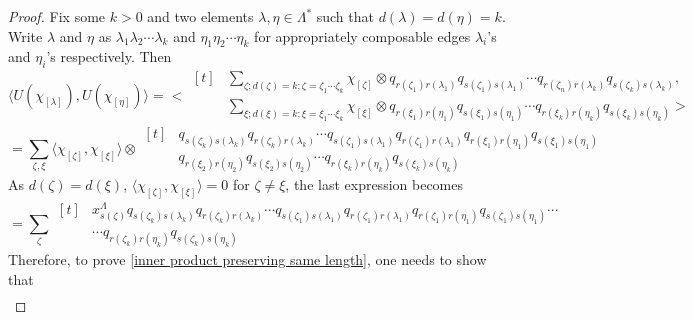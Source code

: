 \documentclass{amsart}
\theoremstyle{plain}
\theoremstyle{definition}
\theoremstyle{remark}
\numberwithin{equation}{section}
\begin{document}
\begin{proof}
\indent Fix some $k>0$ and two elements $\lambda,\eta\in\Lambda^{\ast}$ such that $d(\lambda)=d(\eta)=k$. Write $\lambda$ and $\eta$ as $\lambda_{1}\lambda_{2}\cdots\lambda_{k}$ and $\eta_{1}\eta_{2}\cdots\eta_{k}$ for appropriately composable edges $\lambda_{i}$'s and $\eta_{i}$'s respectively. Then 
\begin{equation*}
    \langle U(\chi_{[\lambda]}), U(\chi_{[\eta]})\rangle = \biggl<
    \begin{aligned}[t]
     &\sum\limits_{\zeta;d(\zeta)=k;\zeta=\zeta_{1}\cdots\zeta_{k}}\chi_{[\zeta]}\otimes q_{r(\zeta_{1})r(\lambda_{1})}q_{s(\zeta_{1})s(\lambda_{1})} \cdots q_{r(\zeta_{n})r(\lambda_{k})}q_{s(\zeta_{k})s(\lambda_{k})},\\
     &\sum\limits_{\xi;d(\xi)=k;\xi=\xi_{1}\cdots\xi_{k}}\chi_{[\xi]}\otimes q_{r(\xi_{1})r(\eta_{1})}q_{s(\xi_{1})s(\eta_{1})} \cdots q_{r(\xi_{k})r(\eta_{k})}q_{s(\xi_{k})s(\eta_{k})} \biggl>
    \end{aligned}
\end{equation*}
\begin{equation*}
    = \sum\limits_{\zeta,\xi} \langle \chi_{[\zeta]}, \chi_{[\xi]} \rangle\otimes 
    \begin{aligned}[t]
        &q_{s(\zeta_{k})s(\lambda_{k})}q_{r(\zeta_{k})r(\lambda_{k})} \cdots q_{s(\zeta_{1})s(\lambda_{1})}q_{r(\zeta_{1})r(\lambda_{1})}q_{r(\xi_{1})r(\eta_{1})}q_{s(\xi_{1})s(\eta_{1})} \\
        &q_{r(\xi_{2})r(\eta_{2})}q_{s(\xi_{2})s(\eta_{2})}\cdots q_{r(\xi_{k})r(\eta_{k})}q_{s(\xi_{k})s(\eta_{k})}
    \end{aligned}
\end{equation*}
As $d(\zeta)=d(\xi)$, $\langle \chi_{[\zeta]}, \chi_{[\xi]} \rangle=0$ for $\zeta\neq \xi$, the last expression becomes
\begin{equation*}
  =\sum\limits_{\zeta}
  \begin{aligned}[t]
      &x_{s(\zeta)}^{\Lambda} q_{s(\zeta_{k})s(\lambda_{k})}q_{r(\zeta_{k})r(\lambda_{k})} \cdots q_{s(\zeta_{1})s(\lambda_{1})}q_{r(\zeta_{1})r(\lambda_{1})}q_{r(\zeta_{1})r(\eta_{1})}q_{s(\zeta_{1})s(\eta_{1})} \cdots \\
      &\cdots q_{r(\zeta_{k})r(\eta_{k})}q_{s(\zeta_{k})s(\eta_{k})} 
  \end{aligned}
\end{equation*}
Therefore, to prove \ref{inner product preserving same length}, one needs to show that
\begin{eqnarray*}

\end{eqnarray*}
\end{proof}
\end{document}
